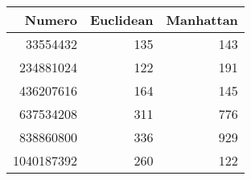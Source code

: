 \begin{tabular}{rrr}
\toprule
Numero & Euclidean & Manhattan \\
\midrule
33554432 & 135 & 143 \\
234881024 & 122 & 191 \\
436207616 & 164 & 145 \\
637534208 & 311 & 776 \\
838860800 & 336 & 929 \\
1040187392 & 260 & 122 \\
\bottomrule
\end{tabular}
